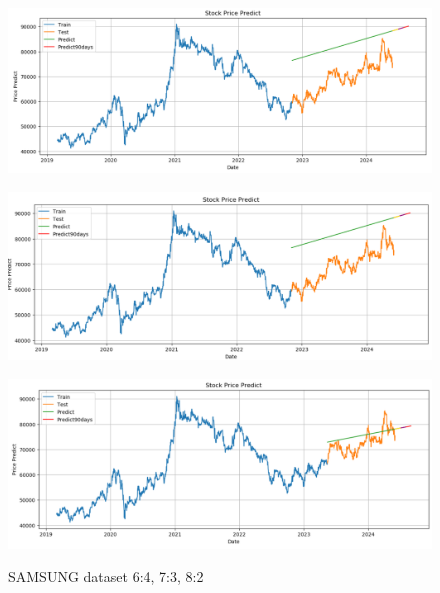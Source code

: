 \documentclass[conference]{IEEEtran}
\begin{document}
\begin{figure}[H]
    \centering
    \begin{minipage}{0.15\textwidth}
    \centering
    \includegraphics[width=1\textwidth]{Image/Linear/Linear_SAMSUNG_6_4.png}
   
    \label{fig:1}
    \end{minipage}%
    \begin{minipage}{0.15\textwidth}
    \centering
    \includegraphics[width=1\textwidth]{Image/Linear/Linear_SAMSUNG_7_3.png}
  
    \label{fig:2}
    \end{minipage}%
    \begin{minipage}{0.15\textwidth}
    \centering
    \includegraphics[width=1\textwidth]{Image/Linear/Linear_SAMSUNG_8_2.png}

    \label{fig:3}
    \end{minipage}
    \caption{SAMSUNG dataset 6:4, 7:3, 8:2}
\end{figure}
\end{document}
